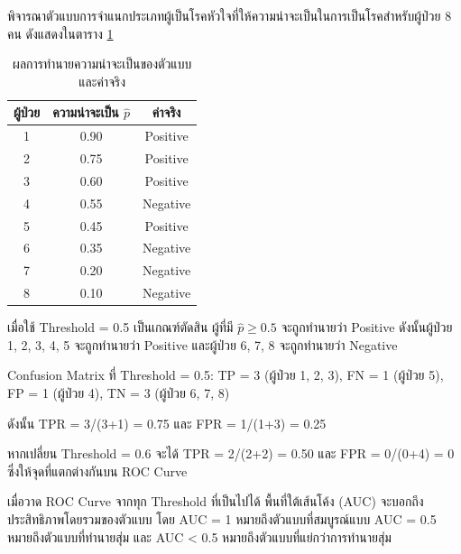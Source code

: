 \begin{exmp}
พิจารณาตัวแบบการจำแนกประเภทผู้เป็นโรคหัวใจที่ให้ความน่าจะเป็นในการเป็นโรคสำหรับผู้ป่วย 8 คน ดังแสดงในตาราง \ref{table:roc_example}

\begin{table}[h]
\centering
\caption{ผลการทำนายความน่าจะเป็นของตัวแบบและค่าจริง}
\label{table:roc_example}
\begin{tabular}{|c|c|c|}
\hline
\textbf{ผู้ป่วย} & \textbf{ความน่าจะเป็น $\hat{p}$} & \textbf{ค่าจริง} \\ \hline
1 & 0.90 & Positive \\ \hline
2 & 0.75 & Positive \\ \hline
3 & 0.60 & Positive \\ \hline
4 & 0.55 & Negative \\ \hline
5 & 0.45 & Positive \\ \hline
6 & 0.35 & Negative \\ \hline
7 & 0.20 & Negative \\ \hline
8 & 0.10 & Negative \\ \hline
\end{tabular}
\end{table}

เมื่อใช้ Threshold = 0.5 เป็นเกณฑ์ตัดสิน ผู้ที่มี $\hat{p} \geq 0.5$ จะถูกทำนายว่า Positive ดังนั้นผู้ป่วย 1, 2, 3, 4, 5 จะถูกทำนายว่า Positive และผู้ป่วย 6, 7, 8 จะถูกทำนายว่า Negative

Confusion Matrix ที่ Threshold = 0.5: TP = 3 (ผู้ป่วย 1, 2, 3), FN = 1 (ผู้ป่วย 5), FP = 1 (ผู้ป่วย 4), TN = 3 (ผู้ป่วย 6, 7, 8)

ดังนั้น TPR = 3/(3+1) = 0.75 และ FPR = 1/(1+3) = 0.25

หากเปลี่ยน Threshold = 0.6 จะได้ TPR = 2/(2+2) = 0.50 และ FPR = 0/(0+4) = 0 ซึ่งให้จุดที่แตกต่างกันบน ROC Curve

เมื่อวาด ROC Curve จากทุก Threshold ที่เป็นไปได้ พื้นที่ใต้เส้นโค้ง (AUC) จะบอกถึงประสิทธิภาพโดยรวมของตัวแบบ โดย AUC = 1 หมายถึงตัวแบบที่สมบูรณ์แบบ AUC = 0.5 หมายถึงตัวแบบที่ทำนายสุ่ม และ AUC < 0.5 หมายถึงตัวแบบที่แย่กว่าการทำนายสุ่ม
\end{exmp}

